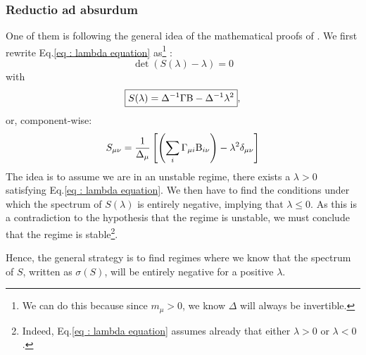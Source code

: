 \documentclass[12pt]{report}
\begin{document}
\subsubsection{Reductio ad absurdum}
One of them is following the general idea of the mathematical proofs of \cite{butler_stability_2018}.
We first rewrite Eq.\eqref{eq : lambda equation} as\footnote{We can do this because since $m_\mu > 0$, we know $\Delta$ will always be invertible.} :
\begin{equation}
\det\left(S(\lambda)-\lambda\right)=0
\end{equation}
with
\begin{equation}
\boxed{S(\lambda)=\Delta^{-1}\Gamma\text{B}-\Delta^{-1}\lambda^2}, \label{eq : equation stability S}
\end{equation}
or, component-wise:
\begin{equation}
S_{\mu \nu} = \frac{1}{\Delta_\mu}\left[\left(\sum_i \Gamma_{\mu i}\text{B}_{i \nu}\right) - \lambda^2 \delta_{\mu\nu}\right] \label{eq : definition S component wise}
\end{equation}
The idea is to assume we are in an unstable regime, there exists a \ie $\lambda > 0$ satisfying Eq.\eqref{eq : lambda equation}. We then have to find the conditions under which the spectrum of $S(\lambda)$ is entirely negative, implying that $\lambda \leq 0$. As this is a contradiction to the hypothesis that the regime is unstable, we must conclude that the regime is stable\footnote{Indeed, Eq.\eqref{eq : lambda equation} assumes already that either $\lambda >0$ or $\lambda < 0$.}.

Hence, the general strategy is to find regimes where we know that the spectrum of $S$, written as $\sigma(S)$, will be entirely negative for a positive $\lambda$.
\end{document}
